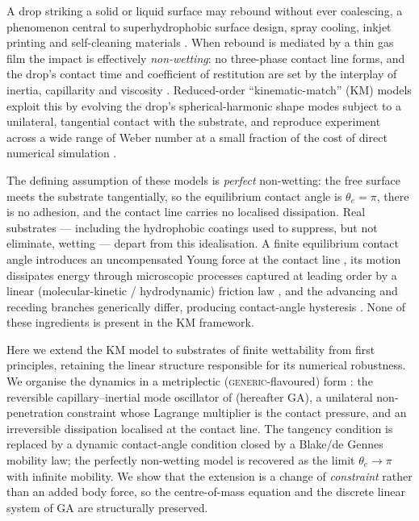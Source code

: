 \documentclass{jfm}
\begin{document}
A drop striking a solid or liquid surface may rebound without ever coalescing, a
phenomenon central to superhydrophobic surface design, spray cooling, inkjet printing
and self-cleaning materials \citep{Richard2002,SnoeijerAndreotti2013}. When rebound is
mediated by a thin gas film the impact is effectively \emph{non-wetting}: no
three-phase contact line forms, and the drop's contact time and coefficient of
restitution are set by the interplay of inertia, capillarity and viscosity
\citep{Richard2002,Okumura2003,MolacekBush2013}. Reduced-order ``kinematic-match'' (KM)
models exploit this by evolving the drop's spherical-harmonic shape modes subject to a
unilateral, tangential contact with the substrate, and reproduce experiment across a
wide range of Weber number at a small fraction of the cost of direct numerical
simulation \citep{GaleanoRios2017,Alventosa2023,gabbard2025}.

The defining assumption of these models is \emph{perfect} non-wetting: the free surface
meets the substrate tangentially, so the equilibrium contact angle is $\theta_e=\pi$,
there is no adhesion, and the contact line carries no localised dissipation. Real
substrates --- including the hydrophobic coatings used to suppress, but not eliminate,
wetting --- depart from this idealisation. A finite equilibrium contact angle introduces
an uncompensated Young force at the contact line \citep{deGennes1985}, its motion
dissipates energy through microscopic processes captured at leading order by a linear
(molecular-kinetic / hydrodynamic) friction law
\citep{Blake2006,Cox1986,Voinov1976,SnoeijerAndreotti2013}, and the advancing and
receding branches generically differ, producing contact-angle hysteresis
\citep{JoannyDeGennes1984}. None of these ingredients is present in the KM framework.

Here we extend the KM model to substrates of finite wettability from first principles,
retaining the linear structure responsible for its numerical robustness. We organise the
dynamics in a metriplectic (\textsc{generic}-flavoured) form
\citep{GrmelaOttinger1997}: the reversible capillary--inertial mode oscillator of
\citet{gabbard2025} (hereafter GA), a unilateral non-penetration constraint whose
Lagrange multiplier is the contact pressure, and an irreversible dissipation localised
at the contact line. The tangency condition is replaced by a dynamic contact-angle
condition closed by a Blake/de Gennes mobility law; the perfectly non-wetting model is
recovered as the limit $\theta_e\to\pi$ with infinite mobility. We show that the
extension is a change of \emph{constraint} rather than an added body force, so the
centre-of-mass equation and the discrete linear system of GA are structurally preserved.
\end{document}
